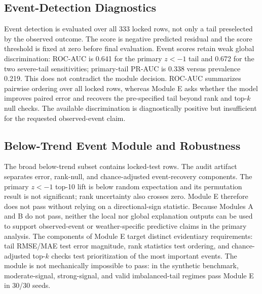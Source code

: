 \documentclass[conference]{IEEEtran}
\begin{document}
\begin{table}[t]
\centering
\caption{Locked 2016--2025 same-task audit. Learned-model predictions are seed
aggregated. $\Delta$RMSE is model minus zero-residual RMSE with paired 95\%
year-block intervals; RMSE is t ha$^{-1}$. The Module B contrast is computed
directly as Full-minus-Metadata; in this panel it matches Full-minus-zero
because Metadata-only predictions coincide with the zero-residual vector to
floating-point precision.}
\label{tab:baselines}
\scriptsize
\resizebox{\textwidth}{!}{}
\end{table}

\subsection{Event-Detection Diagnostics}
Event detection is evaluated over all 333 locked rows, not only a tail preselected
by the observed outcome. The score is negative predicted residual and the score
threshold is fixed at zero before final evaluation. Event scores retain weak
global discrimination: ROC-AUC is 0.641 for the primary $z<-1$ tail and 0.672 for
the two severe-tail sensitivities; primary-tail PR-AUC is 0.338 versus prevalence
0.219. This does not contradict the module decision. ROC-AUC summarizes pairwise
ordering over all locked rows, whereas Module E asks whether the model improves
paired error and recovers the pre-specified tail beyond rank and top-$k$ null
checks. The available discrimination is diagnostically positive but insufficient
for the requested observed-event claim.

\subsection{Below-Trend Event Module and Robustness}
The broad below-trend subset contains \AuditTailRows{} locked-test rows. The
audit artifact separates error, rank-null, and chance-adjusted event-recovery
components. The primary $z<-1$ top-10 lift is below random expectation and its
permutation result is not significant; rank uncertainty also crosses zero. Module E
therefore does not pass without relying on a directional-sign statistic. Because Modules A
and B do not pass, neither the local nor global explanation outputs can be used to
support observed-event or weather-specific predictive claims in the primary
analysis.
The components of Module E target distinct evidentiary requirements: tail RMSE/MAE test
error magnitude, rank statistics test ordering, and chance-adjusted top-$k$
checks test prioritization of the most important events. The module is not
mechanically impossible to pass: in the synthetic benchmark, moderate-signal,
strong-signal, and valid imbalanced-tail regimes pass Module E in 30/30 seeds.
\end{document}
